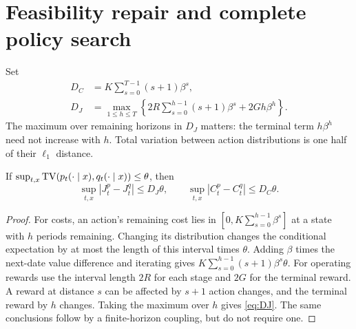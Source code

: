 \section{Feasibility repair and complete policy search}\label{sec:convergence}
Set
\begin{align}
 D_C&=K\sum_{s=0}^{T-1}(s+1)\beta^s,\label{eq:DC}\\
 D_J&=\max_{1\leq h\leq T}\left\{2R\sum_{s=0}^{h-1}(s+1)\beta^s+2Gh\beta^h\right\}.\label{eq:DJ}
\end{align}
The maximum over remaining horizons in $D_J$ matters: the terminal term $h\beta^h$ need not increase with $h$. Total variation between action distributions is one half of their $\ell_1$ distance.

\begin{lemma}\label{lem:perturb}
If $\sup_{t,x}\operatorname{TV}(p_t(\cdot\mid x),q_t(\cdot\mid x))\leq\theta$, then
\[
 \sup_{t,x}|J_t^p-J_t^q|\leq D_J\theta,
 \qquad \sup_{t,x}|C_t^p-C_t^q|\leq D_C\theta.
\]
\end{lemma}
\begin{proof}
For costs, an action's remaining cost lies in $[0,K\sum_{s=0}^{h-1}\beta^s]$ at a state with $h$ periods remaining. Changing its distribution changes the conditional expectation by at most the length of this interval times $\theta$. Adding $\beta$ times the next-date value difference and iterating gives $K\sum_{s=0}^{h-1}(s+1)\beta^s\theta$. For operating rewards use the interval length $2R$ for each stage and $2G$ for the terminal reward. A reward at distance $s$ can be affected by $s+1$ action changes, and the terminal reward by $h$ changes. Taking the maximum over $h$ gives \eqref{eq:DJ}. The same conclusions follow by a finite-horizon coupling, but do not require one.
\end{proof}

